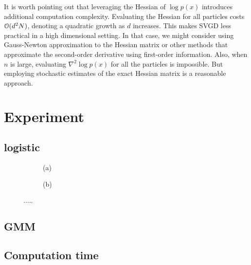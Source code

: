 It is worth pointing out that leveraging the Hessian of $\log p(x)$ introduces additional computation complexity. Evaluating the Hessian for all particles costs $\mathcal{O}(d^2N)$, denoting a quadratic growth as $d$ increases. This makes SVGD less practical in a high dimensional setting. In that case, we might consider using Gauss-Newton approximation to the Hessian matrix or other methods that approximate the second-order derivative using first-order information.
Also, when $n$ is large, evaluating $\nabla^2 \log p(x)$ for all the particles is impossible. But employing  stochastic estimates of the exact Hessian matrix is a reasonable approach.  








\section{Experiment} \label{sec:expt}




\subsection{logistic}

\captionsetup[subfigure]{labelformat=empty}
\begin{figure}[t!]
    \centering 
\begin{subfigure}[b]{.48\textwidth} 
    \caption{(a)   \label{fig:logiselbo}}
\end{subfigure}
\hfill
\centering
\begin{subfigure}[b]{0.48\textwidth}
    \caption{(b)  \label{fig:logisksd}}
\end{subfigure}

\caption{.....}
\label{fig:logistic_reg}
\end{figure}



\subsection{GMM}



\subsection{Computation time}